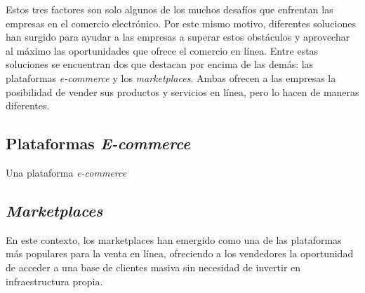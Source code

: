 Estos tres factores son solo algunos de los muchos desafíos que enfrentan las empresas en el comercio electrónico. Por este mismo motivo, diferentes soluciones han surgido para ayudar a las empresas a superar estos obstáculos y aprovechar al máximo las oportunidades que ofrece el comercio en línea. Entre estas soluciones se encuentran dos que destacan por encima de las demás: las plataformas \textit{e-commerce} y los \textit{marketplaces}. Ambas ofrecen a las empresas la posibilidad de vender sus productos y servicios en línea, pero lo hacen de maneras diferentes.

\subsection{Plataformas \textit{E-commerce}}

Una plataforma \textit{e-commerce} \cite{adobe_ecommerce_platforms}

\subsection{\textit{Marketplaces}}

En este contexto, los marketplaces han emergido como una de las plataformas más populares para la venta en línea, ofreciendo a los vendedores la oportunidad de acceder a una base de clientes masiva sin necesidad de invertir en infraestructura propia.
